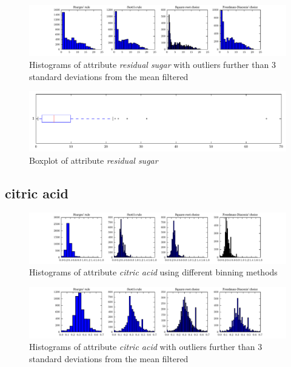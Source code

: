 \documentclass{report}
\begin{document}
\begin{figure}[H]
\includegraphics[width=\textwidth]{histograms/residual_sugar_filtered.pdf}
\caption{Histograms of attribute \emph{residual sugar} with outliers further than 3 standard deviations from the mean filtered}\n\end{figure}

\begin{figure}[H]
\includegraphics[width=\textwidth]{boxplots/residual_sugar.pdf}
\caption{Boxplot of attribute \emph{residual sugar}}\end{figure}

\newpage\subsection{citric acid}
\begin{figure}[H]
\includegraphics[width=\textwidth]{histograms/citric_acid.pdf}
\caption{Histograms of attribute \emph{citric acid} using different binning methods}\end{figure}

\begin{figure}[H]
\includegraphics[width=\textwidth]{histograms/citric_acid_filtered.pdf}
\caption{Histograms of attribute \emph{citric acid} with outliers further than 3 standard deviations from the mean filtered}\n\end{figure}
\end{document}
